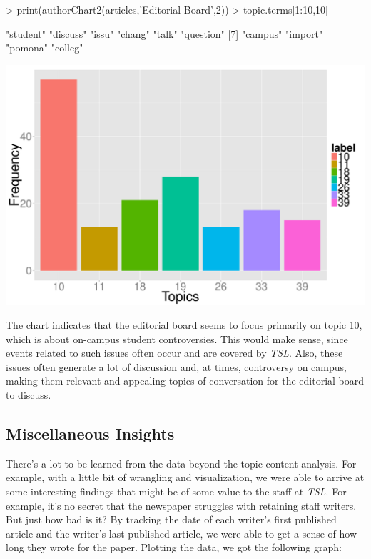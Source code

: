 \documentclass[a4paper]{article}
\begin{document}
\begin{Schunk}
\begin{Sinput}
> print(authorChart2(articles,'Editorial Board',2))
> topic.terms[1:10,10]
\end{Sinput}
\begin{Soutput}
 [1] "student"  "discuss"  "issu"     "chang"    "talk"     "question"
 [7] "campus"   "import"   "pomona"   "colleg"  
\end{Soutput}
\end{Schunk}
\includegraphics{FinalProject-012}

The chart indicates that the editorial board seems to focus primarily on topic 10, which is about on-campus student controversies. This would make sense, since events related to such issues often occur and are covered by \textit{TSL}. Also, these issues often generate a lot of discussion and, at times, controversy on campus, making them relevant and appealing topics of conversation for the editorial board to discuss.

\subsection{Miscellaneous Insights}


There's a lot to be learned from the data beyond the topic content analysis. For example, with a little bit of wrangling and visualization, we were able to arrive at some interesting findings that might be of some value to the staff at \textit{TSL}. For example, it's no secret that the newspaper struggles with retaining staff writers. But just how bad is it? By tracking the date of each writer's first published article and the writer's last published article, we were able to get a sense of how long they wrote for the paper. Plotting the data, we got the following graph:
\end{document}

